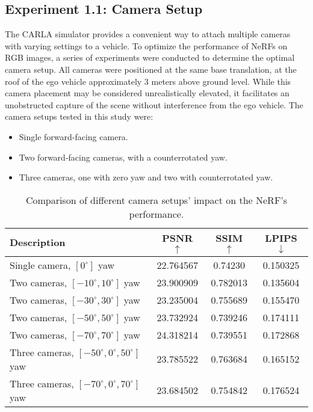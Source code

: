 \subsection{Experiment 1.1: Camera Setup} \label{sec:exp-camera-setup}
The CARLA simulator provides a convenient way to attach multiple cameras with varying settings to a vehicle. To optimize the performance of NeRFs on RGB images, a series of experiments were conducted to determine the optimal camera setup. All cameras were positioned at the same base translation, at the roof of the ego vehicle approximately 3 meters above ground level. While this camera placement may be considered unrealistically elevated, it facilitates an unobstructed capture of the scene without interference from the ego vehicle. The camera setups tested in this study were:

\begin{itemize}
    \item Single forward-facing camera.
    \item Two forward-facing cameras, with a counterrotated yaw.
    \item Three cameras, one with zero yaw and two with counterrotated yaw.
\end{itemize}

\begin{table}[ht]
\centering
\setlength{\tabcolsep}{6pt}
\renewcommand{\arraystretch}{1.5}
\begin{tabular}{l | C{2.2} C{1.3} C{1.3}}
\hline
\textbf{Description} & \textbf{PSNR $\uparrow$} & \textbf{SSIM $\uparrow$} & \textbf{LPIPS $\downarrow$} \\
\hline
Single camera, $[0^{\circ}]$ yaw & 22.764567 & 0.74230 & 0.150325 \\
Two cameras, $[-10^{\circ}, 10^{\circ}]$ yaw & 23.900909 &  0.782013 &  0.135604 \\
Two cameras, $[-30^{\circ}, 30^{\circ}]$ yaw &  23.235004 & 0.755689 & 0.155470 \\
Two cameras, $[-50^{\circ}, 50^{\circ}]$ yaw & 23.732924 &  0.739246 & 0.174111 \\
Two cameras, $[-70^{\circ}, 70^{\circ}]$ yaw &  24.318214 & 0.739551 & 0.172868 \\
Three cameras,  $[-50^{\circ}, 0^{\circ}, 50^{\circ}]$ yaw & 23.785522 & 0.763684 & 0.165152 \\
Three cameras,  $[-70^{\circ}, 0^{\circ}, 70^{\circ}]$ yaw & 23.684502 & 0.754842 &  0.176524 \\
\hline
\end{tabular}
\caption[Results for experiment 1.1: Camera setup]{Comparison of different camera setups' impact on the NeRF's performance.}
\label{tab:exp_camera_setup}
\end{table}

